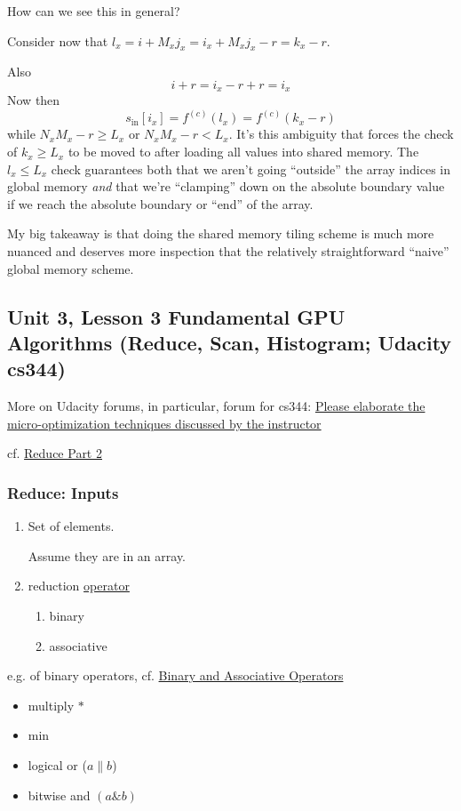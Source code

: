 \documentclass[10pt]{amsart}
\begin{document}
\begin{multicols*}{2}
How can we see this in general?

Consider now that $l_x = i+M_xj_x = i_x +M_xj_x -r = k_x -r$.

Also
\[
i+r = i_x - r+r = i_x
\]
Now then
\[
s_{\text{in}}[i_x] = f^{(c)}(l_x) = f^{(c)}(k_x -r)
\]
while $N_xM_x - r \geq L_x $ or $N_xM_x-r < L_x$.  It's this ambiguity that forces the check of $k_x \geq L_x$ to be moved to after loading all values into shared memory.  The $l_x \leq L_x$ check guarantees both that we aren't going ``outside'' the array indices in global memory \emph{and} that we're ``clamping'' down on the absolute boundary value if we reach the absolute boundary or ``end'' of the array.

My big takeaway is that doing the shared memory tiling scheme is much more nuanced and deserves more inspection that the relatively straightforward ``naive'' global memory scheme.  

\subsection{Unit 3, Lesson 3 Fundamental GPU Algorithms (Reduce, Scan, Histogram; Udacity cs344)}

More on Udacity forums, in particular, forum for cs344: \href{https://discussions.udacity.com/t/please-elaborate-the-micro-optimization-techniques-discussed-by-the-instructor/123454}{Please elaborate the micro-optimization techniques discussed by the instructor}

cf. \href{https://classroom.udacity.com/courses/cs344/lessons/86719951/concepts/875579020923#}{Reduce Part 2}

\subsubsection*{Reduce: Inputs}

\begin{enumerate}
\item Set of elements.

  Assume they are in an array.
\item reduction \underline{operator}
  \begin{enumerate}
    \item binary 
    \item associative
    \end{enumerate}
  \end{enumerate}

e.g. of binary operators, cf. \href{https://classroom.udacity.com/courses/cs344/lessons/86719951/concepts/878363880923#}{Binary and Associative Operators}
\begin{itemize}
  \item multiply $*$ 
  \item min
  \item logical or ($a \parallel b$)
    \item bitwise and $(a\& b)$
  \end{itemize}


\end{multicols*}
\end{document}
